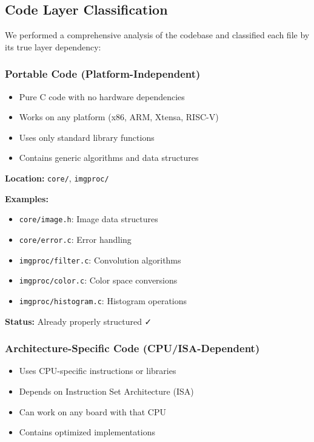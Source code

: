 \documentclass[11pt,a4paper]{article}
\begin{document}
\subsection{Code Layer Classification}

We performed a comprehensive analysis of the codebase and classified each file by its true layer dependency:

\subsubsection{Portable Code (Platform-Independent)}

\begin{tcolorbox}[colback=portablegray!10!white,colframe=portablegray!75!black,title=Portable Layer Characteristics]
\begin{itemize}
    \item Pure C code with no hardware dependencies
    \item Works on any platform (x86, ARM, Xtensa, RISC-V)
    \item Uses only standard library functions
    \item Contains generic algorithms and data structures
\end{itemize}
\end{tcolorbox}

\textbf{Location:} \texttt{core/}, \texttt{imgproc/}

\textbf{Examples:}
\begin{itemize}
    \item \texttt{core/image.h}: Image data structures
    \item \texttt{core/error.c}: Error handling
    \item \texttt{imgproc/filter.c}: Convolution algorithms
    \item \texttt{imgproc/color.c}: Color space conversions
    \item \texttt{imgproc/histogram.c}: Histogram operations
\end{itemize}

\textbf{Status:} \colorbox{green!30}{Already properly structured} ✓

\subsubsection{Architecture-Specific Code (CPU/ISA-Dependent)}

\begin{tcolorbox}[colback=archblue!10!white,colframe=archblue!75!black,title=Architecture Layer Characteristics]
\begin{itemize}
    \item Uses CPU-specific instructions or libraries
    \item Depends on Instruction Set Architecture (ISA)
    \item Can work on any board with that CPU
    \item Contains optimized implementations
\end{itemize}
\end{tcolorbox}
\end{document}
